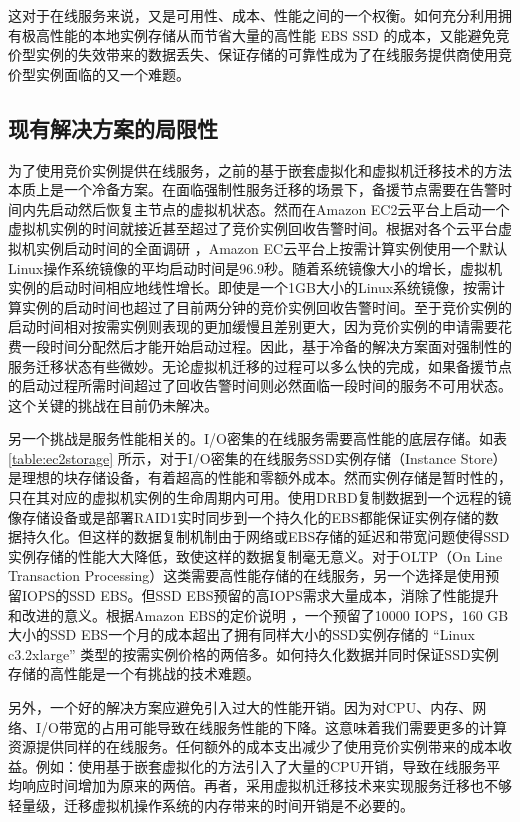 这对于在线服务来说，又是可用性、成本、性能之间的一个权衡。如何充分利用拥有极高性能的本地实例存储从而节省大量的高性能 EBS SSD 的成本，又能避免竞价型实例的失效带来的数据丢失、保证存储的可靠性成为了在线服务提供商使用竞价型实例面临的又一个难题。
\subsection{现有解决方案的局限性}
\label{sec:gemini_challenges}
为了使用竞价实例提供在线服务，之前的基于嵌套虚拟化和虚拟机迁移技术的方法\cite{He:2015:CCH:2749246.2749275}本质上是一个冷备方案。在面临强制性服务迁移的场景下，备援节点需要在告警时间内先启动然后恢复主节点的虚拟机状态。然而在Amazon EC2云平台上启动一个虚拟机实例的时间就接近甚至超过了竞价实例回收告警时间。根据对各个云平台虚拟机实例启动时间的全面调研 \cite{Mao:2012:PSV:2353730.2353859}，Amazon EC云平台上按需计算实例使用一个默认Linux操作系统镜像的平均启动时间是96.9秒。随着系统镜像大小的增长，虚拟机实例的启动时间相应地线性增长。即使是一个1GB大小的Linux系统镜像，按需计算实例的启动时间也超过了目前两分钟的竞价实例回收告警时间。至于竞价实例的启动时间相对按需实例则表现的更加缓慢且差别更大，因为竞价实例的申请需要花费一段时间分配然后才能开始启动过程。因此，基于冷备的解决方案面对强制性的服务迁移状态有些微妙。无论虚拟机迁移的过程可以多么快的完成，如果备援节点的启动过程所需时间超过了回收告警时间则必然面临一段时间的服务不可用状态。这个关键的挑战在目前仍未解决。

另一个挑战是服务性能相关的。I/O密集的在线服务需要高性能的底层存储。如表 \ref{table:ec2storage} 所示，对于I/O密集的在线服务SSD实例存储（Instance Store）是理想的块存储设备，有着超高的性能和零额外成本。然而实例存储是暂时性的，只在其对应的虚拟机实例的生命周期内可用。使用DRBD复制数据到一个远程的镜像存储设备或是部署RAID1实时同步到一个持久化的EBS都能保证实例存储的数据持久化。但这样的数据复制机制由于网络或EBS存储的延迟和带宽问题使得SSD实例存储的性能大大降低，致使这样的数据复制毫无意义。对于OLTP（On Line Transaction Processing）这类需要高性能存储的在线服务，另一个选择是使用预留IOPS的SSD EBS。但SSD EBS预留的高IOPS需求大量成本，消除了性能提升和改进的意义。根据Amazon EBS的定价说明 \cite{EBSPricing:2015}，一个预留了10000 IOPS，160 GB 大小的SSD EBS一个月的成本超出了拥有同样大小的SSD实例存储的 ``Linux c3.2xlarge'' 类型的按需实例价格的两倍多。如何持久化数据并同时保证SSD实例存储的高性能是一个有挑战的技术难题。

另外，一个好的解决方案应避免引入过大的性能开销。因为对CPU、内存、网络、I/O带宽的占用可能导致在线服务性能的下降。这意味着我们需要更多的计算资源提供同样的在线服务。任何额外的成本支出减少了使用竞价实例带来的成本收益。例如：使用基于嵌套虚拟化的方法引入了大量的CPU开销，导致在线服务平均响应时间增加为原来的两倍。再者，采用虚拟机迁移技术来实现服务迁移也不够轻量级，迁移虚拟机操作系统的内存带来的时间开销是不必要的。

